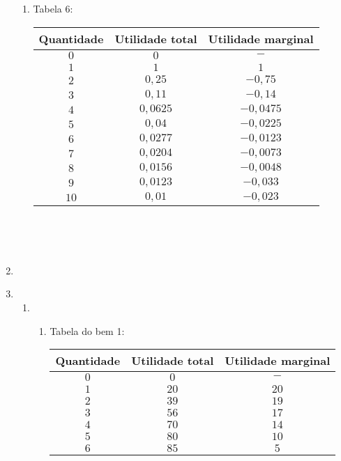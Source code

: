 \documentclass[a4paper, 12pt]{article}
\begin{document}
\begin{enumerate}
\begin{enumerate}
		\item Tabela 6:
		\begin{table}[H]
			\centering
			\begin{tabular}{|c|c|c|}
				\hline
				Quantidade & Utilidade total & Utilidade marginal \\ \hline
				$0$ & $0$ & $-$\\ \hline
				$1$ & $1$ & $1$\\ \hline
				$2$ & $0,25$ & $-0,75$\\ \hline
				$3$ & $0,11$ & $-0,14$\\ \hline
				$4$ & $0,0625$ & $-0,0475$\\ \hline
				$5$ & $0,04$ & $-0,0225$\\ \hline
				$6$ & $0,0277$ & $-0,0123$\\ \hline
				$7$ & $0,0204$ & $-0,0073$\\ \hline
				$8$ & $0,0156$ & $-0,0048$\\ \hline
				$9$ & $0,0123$ & $-0,033$\\ \hline
				$10$ & $0,01$ & $-0,023$\\ \hline
			\end{tabular}
		\end{table}\\
	\end{enumerate}
	\\

	\item 
	\\

	\item %
	\begin{enumerate}
		\item 
		\begin{enumerate}
		\item Tabela do bem 1:
		\begin{table}[H]
			\centering
			\begin{tabular}{|c|c|c|}
				\hline
				Quantidade & Utilidade total & Utilidade marginal \\ \hline
				$0$ & $0$ & $-$\\ \hline
				$1$ & $20$ & $20$\\ \hline
				$2$ & $39$ & $19$\\ \hline
				$3$ & $56$ & $17$\\ \hline
				$4$ & $70$ & $14$\\ \hline
				$5$ & $80$ & $10$\\ \hline
				$6$ & $85$ & $5$\\ \hline
			\end{tabular}
		\end{table}
		

\end{enumerate}
\end{enumerate}
\end{enumerate}
\end{document}
